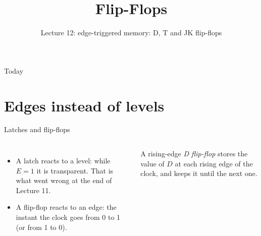 \documentclass[10pt]{wosm-slides}
\title[Lecture 12 \textperiodcentered\ Flip-Flops]{Flip-Flops}
\subtitle{Lecture 12: edge-triggered memory: D, T and JK flip-flops}
\begin{document}
\maketitle

\begin{frame}{Today}
  \tableofcontents
\end{frame}

\section{Edges instead of levels}

\begin{frame}{Latches and flip-flops}
  \begin{columns}[c, totalwidth=\textwidth]
      \begin{itemize}
        \item A latch reacts to a \alert{level}: while $E = 1$ it is transparent.
          That is what went wrong at the end of Lecture 11.
        \item A \alert{flip-flop} reacts to an \alert{edge}: the instant the clock goes
          from 0 to 1 (or from 1 to 0).
      \end{itemize}
      \begin{definition}
        A rising-edge \emph{D flip-flop} stores the value of $D$ at each rising edge
        of the clock, and keeps it until the next one.
      \end{definition}
      \centering
      \par\medskip
  \end{columns}
\end{frame}
\end{document}
